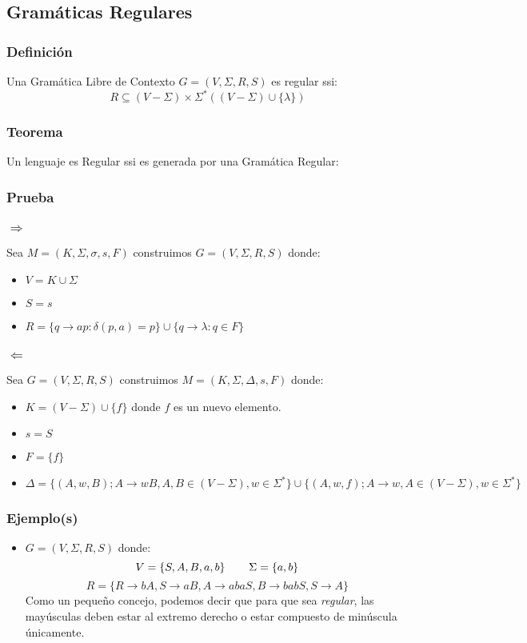 \subsection{Gramáticas Regulares}
\subsubsection{Definición}
Una Gramática Libre de Contexto $G=(V,\Sigma,R,S)$ es regular ssi:
$$
R \subseteq (V-\Sigma)\times \Sigma^*((V-\Sigma)\cup \{ \lambda \} )
$$
\subsubsection{Teorema}
Un lenguaje es Regular ssi es generada por una Gramática Regular:
\subsubsection*{Prueba}
\subsubsection*{ $\Rightarrow$}
Sea $M=(K,\Sigma,\sigma,s,F)$ construimos $G=(V,\Sigma , R,S)$ donde:
\begin{itemize}
\item $V= K \cup \Sigma$
\item $S = s$
\item $R = \{ q \rightarrow ap : \delta(p,a)=p \} \cup \{ q \rightarrow \lambda : q\in F \}$
\end{itemize}
\subsubsection*{$\Leftarrow$}
Sea $G = (V,\Sigma,R,S)$ construimos $M=(K,\Sigma,\Delta,s,F)$ donde:
\begin{itemize}
\item $K = (V-\Sigma) \cup \{f\}$ donde $f$ es un nuevo elemento.
\item $s=S$
\item $F=\{f\}$
\item $\Delta = \big\{ (A,w,B);A\rightarrow wB, A,B \in (V-\Sigma) ,w \in \Sigma^* \big\} \cup \big\{ (A,w,f);A\rightarrow w, A \in (V-\Sigma) ,w \in \Sigma^* \big\}$
\end{itemize}
\subsubsection{Ejemplo(s)}
\begin{itemize}
\item $G =(V,\Sigma,R,S)$ donde:
$$
	V = \{ S, A, B, a ,b \} \hspace{0.75cm} \Sigma = \{ a ,b \} 
$$
$$
	R =\{ R\rightarrow bA,S\rightarrow aB,A\rightarrow abaS,B\rightarrow babS, S\rightarrow A \}
$$
Como un pequeño concejo, podemos decir que para que sea \textit{regular}, las mayúsculas deben estar al extremo derecho o estar compuesto de minúscula únicamente.
\end{itemize}
